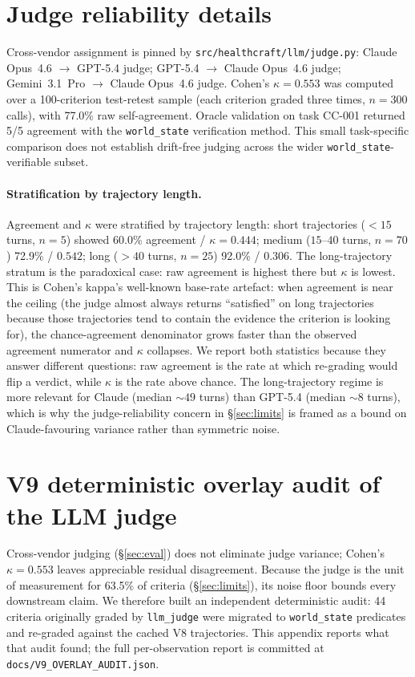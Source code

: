 \section{Judge reliability details}
\label{app:judge}

Cross-vendor assignment is pinned by
\texttt{src/healthcraft/llm/judge.py}:
Claude Opus~4.6 $\to$ GPT-5.4 judge; GPT-5.4 $\to$ Claude Opus~4.6
judge; Gemini~3.1~Pro $\to$ Claude Opus~4.6 judge. Cohen's
$\kappa=0.553$ was computed over a 100-criterion test-retest sample
(each criterion graded three times, $n=300$ calls), with 77.0\% raw
self-agreement. Oracle validation on task CC-001 returned 5/5 agreement
with the \texttt{world\_state} verification method. This small
task-specific comparison does not establish drift-free judging across
the wider \texttt{world\_state}-verifiable subset.

\paragraph{Stratification by trajectory length.}
Agreement and $\kappa$ were stratified by trajectory length: short
trajectories ($<15$ turns, $n=5$) showed 60.0\% agreement /
$\kappa=0.444$; medium ($15$--$40$ turns, $n=70$) 72.9\% / $0.542$;
long ($>40$ turns, $n=25$) 92.0\% / $0.306$. The long-trajectory
stratum is the paradoxical case: raw agreement is highest there but
$\kappa$ is lowest. This is Cohen's kappa's well-known base-rate
artefact: when agreement is near the ceiling (the judge almost
always returns ``satisfied'' on long trajectories because those
trajectories tend to contain the evidence the criterion is looking
for), the chance-agreement denominator grows faster than the observed
agreement numerator and $\kappa$ collapses. We report both statistics
because they answer different questions: raw agreement is the rate
at which re-grading would flip a verdict, while $\kappa$ is the rate
above chance. The long-trajectory regime is more relevant for Claude
(median $\sim 49$ turns) than GPT-5.4 (median $\sim 8$ turns), which
is why the judge-reliability concern in \S\ref{sec:limits} is framed
as a bound on Claude-favouring variance rather than symmetric noise.

\section{V9 deterministic overlay audit of the LLM judge}
\label{app:v9-overlay}

Cross-vendor judging (\S\ref{sec:eval}) does not eliminate judge
variance; Cohen's $\kappa=0.553$ leaves appreciable residual
disagreement. Because the judge is the unit of measurement for
63.5\% of criteria %
(\S\ref{sec:limits}), its noise floor bounds every downstream claim.
We therefore built an independent deterministic audit:
44 criteria %
originally graded by \texttt{llm\_judge} were migrated to
\texttt{world\_state} predicates and re-graded against the cached V8
trajectories. This appendix reports what that audit found; the full
per-observation report is committed at
\texttt{docs/V9\_OVERLAY\_AUDIT.json}.

